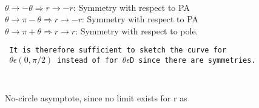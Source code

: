 \documentclass{article}
\begin{document}
	\begin{enumerate}{\tt
		\setcounter{enumi}{1}
		\item $\theta \rightarrow -\theta \Rightarrow r \rightarrow -r$: Symmetry with respect to PA\\
		$\theta \rightarrow \pi -\theta \Rightarrow r \rightarrow -r$: Symmetry with respect to PA\\
		$\theta \rightarrow \pi +\theta \Rightarrow r \rightarrow r$: Symmetry with respect to pole.
	}	
	\end{enumerate}
	{  \tt 
		It is therefore sufficient to sketch the curve for\\ }
	{ \tt 
		$\theta\epsilon(0,\pi/2)$ instead of for $\theta\epsilon$D since there are symmetries.\\}
	\begin{enumerate}{\tt
		\setcounter{enumi}{2}
		\item No-circle asymptote, since no limit exists for r  as  
	}
	\end{enumerate}
	
\end{document}
